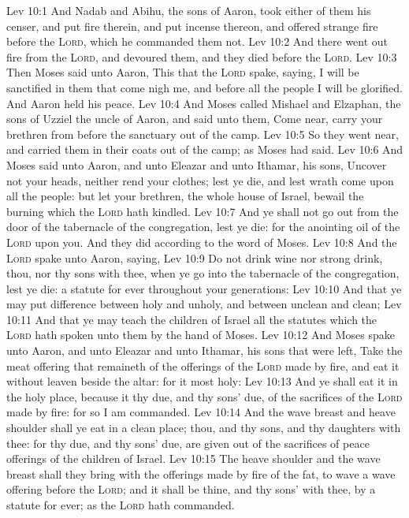 \vs Lev 10:1 And Nadab and Abihu, the sons of Aaron, took either of them his censer, and put fire therein, and put incense thereon, and offered stran\-ge fire before the \textsc{Lord}, which he commanded them not.
\vs Lev 10:2 And there went out fire from the \textsc{Lord}, and devoured them, and they died before the \textsc{Lord}.
\vs Lev 10:3 Then Moses said unto Aaron, This  that the \textsc{Lord} spake, saying, I will be sanctified in them that come nigh me, and before all the people I will be glorified. And Aaron held his peace.
\vs Lev 10:4 And Moses called Mishael and Elzaphan, the sons of Uzziel the uncle of Aaron, and said unto them, Come near, carry your brethren from before the sanctuary out of the camp.
\vs Lev 10:5 So they went near, and carried them in their coats out of the camp; as Moses had said.
\vs Lev 10:6 And Moses said unto Aaron, and unto Eleazar and unto Ithamar, his sons, Uncover not your heads, neither rend your clothes; lest ye die, and lest wrath come upon all the people: but let your brethren, the whole house of Israel, bewail the burning which the \textsc{Lord} hath kindled.
\vs Lev 10:7 And ye shall not go out from the door of the tabernacle of the congregation, lest ye die: for the anointing oil of the \textsc{Lord}  upon you. And they did according to the word of Moses.
\vs Lev 10:8 And the \textsc{Lord} spake unto Aaron, saying,
\vs Lev 10:9 Do not drink wine nor strong drink, thou, nor thy sons with thee, when ye go into the tabernacle of the congregation, lest ye die:  a statute for ever throughout your generations:
\vs Lev 10:10 And that ye may put difference between holy and unholy, and between unclean and clean;
\vs Lev 10:11 And that ye may teach the children of Israel all the statutes which the \textsc{Lord} hath spoken unto them by the hand of Moses.
\vs Lev 10:12 And Moses spake unto Aaron, and unto Eleazar and unto Ithamar, his sons that were left, Take the meat offering that remaineth of the offerings of the \textsc{Lord} made by fire, and eat it without leaven beside the altar: for it  most holy:
\vs Lev 10:13 And ye shall eat it in the holy place, because it  thy due, and thy sons' due, of the sacrifices of the \textsc{Lord} made by fire: for so I am commanded.
\vs Lev 10:14 And the wave breast and heave shoulder shall ye eat in a clean place; thou, and thy sons, and thy daughters with thee: for  thy due, and thy sons' due,  are given out of the sacrifices of peace offerings of the children of Israel.
\vs Lev 10:15 The heave shoulder and the wave breast shall they bring with the offerings made by fire of the fat, to wave  a wave offering before the \textsc{Lord}; and it shall be thine, and thy sons' with thee, by a statute for ever; as the \textsc{Lord} hath commanded.

